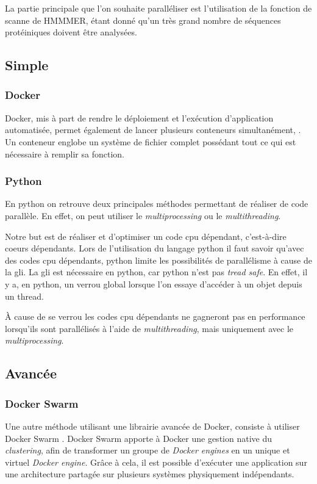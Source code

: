 La partie principale que l'on souhaite paralléliser est l'utilisation de la fonction de scanne de HMMMER, étant donné qu'un très grand nombre de séquences protéiniques doivent être analysées.

\newpage
\subsection{Simple}
\subsubsection{Docker}
Docker, mis à part de rendre le déploiement et l'exécution d'application automatisée, permet également de lancer plusieurs conteneurs simultanément, . Un conteneur englobe un système de fichier complet possédant tout ce qui est nécessaire à remplir sa fonction. 

\subsubsection{Python}
En python on retrouve deux principales méthodes permettant de réaliser de code parallèle. En effet, on peut utiliser le \emph{multiprocessing} ou le \emph{multithreading}.

Notre but est de réaliser et d'optimiser un code \gls{cpu} dépendant, c'est-à-dire coeurs dépendants. Lors de l'utilisation du langage python il faut savoir qu'avec des codes \gls{cpu} dépendants, python limite les possibilités de parallélisme à cause de la \gls{gli}. La \gls{gli} est nécessaire en python, car python n'est pas \emph{tread safe}. En effet, il y a, en python, un verrou global lorsque l'on essaye d'accéder à un objet depuis un thread.

À cause de se verrou les codes \gls{cpu} dépendants ne gagneront pas en performance lorsqu'ils sont parallélisés à l'aide de \emph{multithreading}, mais uniquement avec le \emph{multiprocessing}.

\subsection{Avancée}
\subsubsection{Docker Swarm}
Une autre méthode utilisant une librairie avancée de Docker, consiste à utiliser Docker Swarm \cite{9}. Docker Swarm apporte à Docker une gestion native du \emph{clustering}, afin de transformer un groupe de \emph{Docker engines} en un unique et virtuel \emph{Docker engine}. Grâce à cela, il est possible d'exécuter une application sur une architecture partagée sur plusieurs systèmes physiquement indépendants. 

